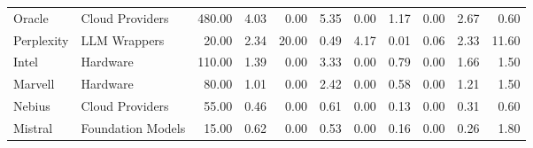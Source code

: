 \begin{tabular}{llrrrrrrrrr}
Oracle & Cloud Providers & 480.00 & 4.03 & 0.00 & 5.35 & 0.00 & 1.17 & 0.00 & 2.67 & 0.60 \\
Perplexity & LLM Wrappers & 20.00 & 2.34 & 20.00 & 0.49 & 4.17 & 0.01 & 0.06 & 2.33 & 11.60 \\
Intel & Hardware & 110.00 & 1.39 & 0.00 & 3.33 & 0.00 & 0.79 & 0.00 & 1.66 & 1.50 \\
Marvell & Hardware & 80.00 & 1.01 & 0.00 & 2.42 & 0.00 & 0.58 & 0.00 & 1.21 & 1.50 \\
Nebius & Cloud Providers & 55.00 & 0.46 & 0.00 & 0.61 & 0.00 & 0.13 & 0.00 & 0.31 & 0.60 \\
Mistral & Foundation Models & 15.00 & 0.62 & 0.00 & 0.53 & 0.00 & 0.16 & 0.00 & 0.26 & 1.80 \\
\bottomrule
\end{tabular}
